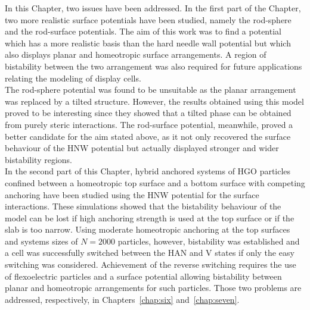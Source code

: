 \conclusion

In this Chapter, two issues have been addressed. In the first part of the Chapter, two
more realistic surface potentials have been studied, namely the rod-sphere and the rod-surface
potentials. The aim of this work was to find a potential which has a more realistic basis
than the hard needle wall potential but which also displays planar and homeotropic surface
arrangements. A region of bistability between the two arrangement was also required for future
applications relating the modeling of display cells.\\
The rod-sphere potential was found to be unsuitable as the planar arrangement was replaced by a
tilted structure. However, the results obtained using this model proved to be interesting
since they showed that a tilted phase can be obtained from purely steric interactions. The
rod-surface potential, meanwhile, proved a better candidate for the aim stated above, as it
not only recovered the surface behaviour of the HNW potential but actually displayed stronger
and wider bistability regions.\\
In the second part of this Chapter, hybrid anchored systems of HGO particles confined between a
homeotropic top surface and a bottom surface with competing anchoring have been studied using
the HNW potential for the surface interactions. These simulations showed that the
bistability behaviour of the model can be lost if high anchoring strength is used at the top
surface or if the slab is too narrow. Using moderate homeotropic anchoring at the top surfaces
and systems sizes of $N=2000$ particles, however, bistability was established and a cell
was successfully switched between the HAN and V states if only the easy switching was
considered. Achievement of the reverse switching requires the use of flexoelectric particles and
a surface potential allowing bistability between planar and homeotropic arrangements for such
particles. Those two problems are addressed, respectively, in Chapters~\ref{chap:six}
and~\ref{chap:seven}.






